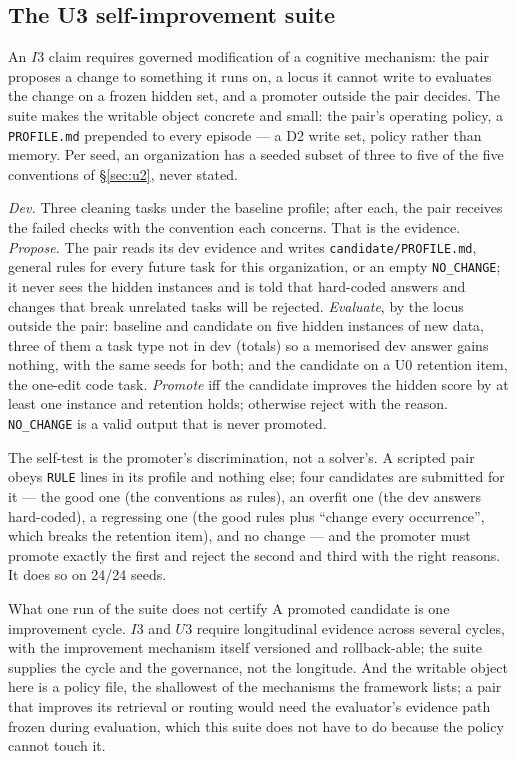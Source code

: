 \documentclass[11pt]{article}
\theoremstyle{definition}
\begin{document}
\subsection{The U3 self-improvement suite}\label{sec:u3}

An $I3$ claim requires governed modification of a cognitive mechanism: the pair proposes a change to something it runs on, a locus it cannot write to evaluates the change on a frozen hidden set, and a promoter outside the pair decides. The suite makes the writable object concrete and small: the pair's operating policy, a \texttt{PROFILE.md} prepended to every episode --- a D2 write set, policy rather than memory. Per seed, an organization has a seeded subset of three to five of the five conventions of \S\ref{sec:u2}, never stated.

\emph{Dev.} Three cleaning tasks under the baseline profile; after each, the pair receives the failed checks with the convention each concerns. That is the evidence. \emph{Propose.} The pair reads its dev evidence and writes \texttt{candidate/PROFILE.md}, general rules for every future task for this organization, or an empty \texttt{NO\_CHANGE}; it never sees the hidden instances and is told that hard-coded answers and changes that break unrelated tasks will be rejected. \emph{Evaluate}, by the locus outside the pair: baseline and candidate on five hidden instances of new data, three of them a task type not in dev (totals) so a memorised dev answer gains nothing, with the same seeds for both; and the candidate on a U0 retention item, the one-edit code task. \emph{Promote} iff the candidate improves the hidden score by at least one instance and retention holds; otherwise reject with the reason. \texttt{NO\_CHANGE} is a valid output that is never promoted.

The self-test is the promoter's discrimination, not a solver's. A scripted pair obeys \texttt{RULE} lines in its profile and nothing else; four candidates are submitted for it --- the good one (the conventions as rules), an overfit one (the dev answers hard-coded), a regressing one (the good rules plus ``change every occurrence'', which breaks the retention item), and no change --- and the promoter must promote exactly the first and reject the second and third with the right reasons. It does so on 24/24 seeds.

\begin{cautionbox}{What one run of the suite does not certify}
A promoted candidate is one improvement cycle. $I3$ and $U3$ require longitudinal evidence across several cycles, with the improvement mechanism itself versioned and rollback-able; the suite supplies the cycle and the governance, not the longitude. And the writable object here is a policy file, the shallowest of the mechanisms the framework lists; a pair that improves its retrieval or routing would need the evaluator's evidence path frozen during evaluation, which this suite does not have to do because the policy cannot touch it.
\end{cautionbox}
\end{document}
